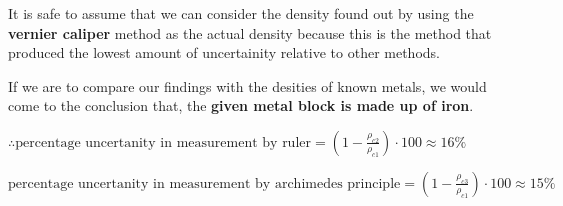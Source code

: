 
        
{It is safe to assume that we can consider the density found out by using the \textbf{vernier caliper} method as the actual density because this is the method that produced the lowest amount of uncertainity relative to other methods.}

{If we are to compare our findings with the desities of known metals, we would come to the conclusion that, the \textbf{given metal block is made up of iron}.}

{$\therefore \text{percentage uncertanity in measurement by ruler} = \left(1 - \frac{\rho_{c2}}{\rho_{c1}}\right)\cdot 100 \approx 16 \%$}

{$\text{percentage uncertanity in measurement by archimedes principle} = \left(1 - \frac{\rho_{c3}}{\rho_{c1}}\right)\cdot 100 \approx 15 \%$}

